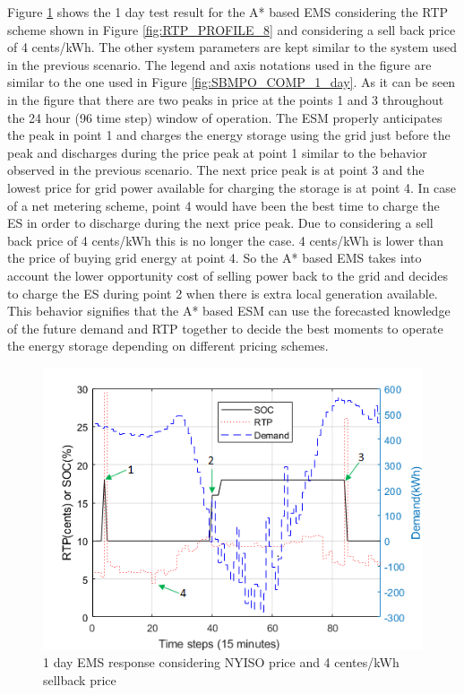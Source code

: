 Figure \ref{fig:VAR_1_day_example} shows the 1 day test result for the A* based EMS considering the RTP scheme shown in Figure \ref{fig:RTP_PROFILE_8} and considering a sell back price of 4 cents/kWh. The other system parameters are kept similar to the system used in the previous scenario. The legend and axis notations used in the figure are similar to the one used in Figure \ref{fig:SBMPO_COMP_1_day}. As it can be seen in the figure that there are two peaks in price at the points 1 and 3 throughout the 24 hour (96 time step) window of operation. The ESM properly anticipates the peak in point 1 and charges the energy storage using the grid just before the peak and discharges during the price peak at point 1 similar to the behavior observed in the previous scenario. The next price peak is at point 3 and the lowest price for grid power available for charging the storage is at point 4. In case of a net metering scheme, point 4 would have been the best time to charge the ES in order to discharge during the next price peak. Due to considering a sell back price of 4 cents/kWh this is no longer the case. 4 cents/kWh is lower than the price of buying grid energy at point 4. So the A* based EMS takes into account the lower opportunity cost of selling power back to the grid and decides to charge the ES during point 2 when there is extra local generation available. This behavior signifies that the A* based ESM can use the forecasted knowledge of the future demand and RTP together to decide the best moments to operate the energy storage depending on different pricing schemes.
 \begin{figure}[!ht]
    \centering
    \includegraphics[width = \linewidth]{figs/VAR_1_day_example.png}
    \caption{1 day EMS response considering NYISO price and 4 centes/kWh sellback price}
    \label{fig:VAR_1_day_example}
\end{figure}

